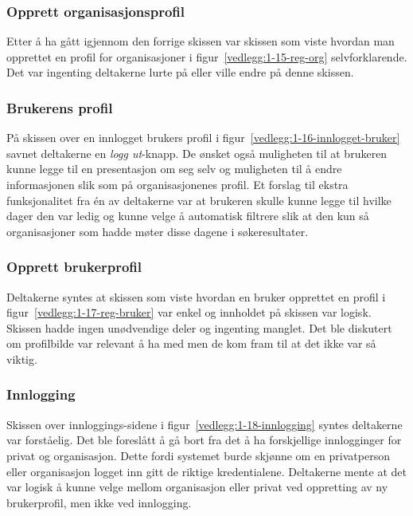 \subsubsection{Opprett organisasjonsprofil}

Etter å ha gått igjennom den forrige skissen var skissen som viste hvordan man opprettet en profil for organisasjoner i figur~\ref{vedlegg:1-15-reg-org} selvforklarende. Det var ingenting deltakerne lurte på eller ville endre på denne skissen.

\subsubsection{Brukerens profil}

På skissen over en innlogget brukers profil i figur~\ref{vedlegg:1-16-innlogget-bruker} savnet deltakerne en {\em  logg ut}-knapp. De ønsket også muligheten til at brukeren kunne legge til en presentasjon om seg selv og muligheten til å endre informasjonen slik som på organisasjonenes profil. Et forslag til ekstra funksjonalitet fra én av deltakerne var at brukeren skulle kunne legge til hvilke dager den var ledig og kunne velge å automatisk filtrere slik at den kun så organisasjoner som hadde møter disse dagene i søkeresultater.


\subsubsection{Opprett brukerprofil}

Deltakerne syntes at skissen som viste hvordan en bruker opprettet en profil i figur~\ref{vedlegg:1-17-reg-bruker} var enkel og innholdet på skissen var logisk. Skissen hadde ingen unødvendige deler og ingenting manglet. Det ble diskutert om profilbilde var relevant å ha med men de kom fram til at det ikke var så viktig. 


\subsubsection{Innlogging}

Skissen over innloggings-sidene i figur~\ref{vedlegg:1-18-innlogging} syntes deltakerne var forståelig. Det ble foreslått å gå bort fra det å ha forskjellige innlogginger for privat og organisasjon. Dette fordi systemet burde skjønne om en privatperson eller organisasjon logget inn gitt de riktige kredentialene. Deltakerne mente at det var logisk å kunne velge mellom organisasjon eller privat ved oppretting av ny brukerprofil, men ikke ved innlogging.


